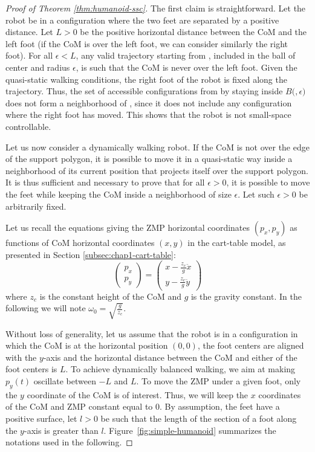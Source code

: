 \begin{proof}[Proof of Theorem \ref{thm:humanoid-ssc}]

The first claim is straightforward. Let the robot be in a
configuration \config{} where the two feet are separated by a positive
distance. Let $L>0$ be the positive horizontal distance between the
CoM and the left foot (if the CoM is over the left foot, we can
consider similarly the right foot). For all $\epsilon < L$, any valid
trajectory starting from \config{}, included in the ball of center
\config{} and radius $\epsilon$, is such that the CoM is never over
the left foot.  Given the quasi-static walking conditions, the right
foot of the robot is fixed along the trajectory. Thus, the set of
accessible configurations from \config{} by staying inside
$B($\config{}$,\epsilon)$ does not form a neighborhood of \config{},
since it does not include any configuration where the right foot has
moved. This shows that the robot is not small-space controllable.

\bigskip

Let us now consider a dynamically walking robot. If the CoM is not
over the edge of the support polygon, it is possible to move it in a
quasi-static way inside a neighborhood of its current position that
projects itself over the support polygon. It is thus sufficient and
necessary to prove that for all $\epsilon >0$, it is possible to move
the feet while keeping the CoM inside a neighborhood of size
$\epsilon$. Let such $\epsilon >0$ be arbitrarily fixed.

Let us recall the equations giving the ZMP horizontal coordinates
$(p_x,p_y)$ as functions of CoM horizontal coordinates $(x,y)$ in the
cart-table model, as presented in Section
\ref{subsec:chap1-cart-table}:
\begin{equation}
\label{eq:walk-zmp}
\left(
\begin{array}{c}
p_x\\ p_y
\end{array}
\right) = \displaystyle \left(
\begin{array}{c}
x - \frac{z_c}{g} \ddot{x}\\ y - \frac{z_c}{g} \ddot{y}
\end{array}
\right)
\end{equation}
where $z_c$ is  the constant height of the CoM and  $g$ is the gravity
constant.    In    the    following    we    will    note    $\omega_0
=\sqrt{\frac{g}{z_c}}$.

Without loss of generality, let us assume that the robot is in a
configuration in which the CoM is at the horizontal position $(0,0)$,
the foot centers are aligned with the $y$-axis and the horizontal
distance between the CoM and either of the foot centers is $L$. To
achieve dynamically balanced walking, we aim at making $p_y(t)$
oscillate between $-L$ and $L$. To move the ZMP under a given foot,
only the $y$ coordinate of the CoM is of interest. Thus, we will keep
the $x$ coordinates of the CoM and ZMP constant equal to $0$. By
assumption, the feet have a positive surface, let $l>0$ be such that
the length of the section of a foot along the $y$-axis is greater than
$l$. Figure~\ref{fig:simple-humanoid} summarizes the notations used in
the following.


\end{proof}
